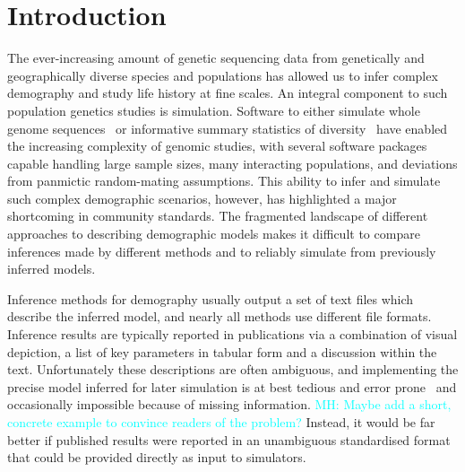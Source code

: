 \documentclass[11pt]{article}
\newcommand{\stdpopsim}[0]{\texttt{stdpopsim}}
\newcommand{\aprcomment}[1]{{\textcolor{blue}{APR: #1}}}
\newcommand{\mhcomment}[1]{{\textcolor{cyan}{MH: #1}}}
\begin{document}
\section*{Introduction}

The ever-increasing amount of genetic sequencing data from genetically and
geographically diverse species and populations has allowed us to infer complex
demography and study life history at fine scales.
An integral component to such population genetics studies is simulation.
Software to either simulate whole genome
sequences~\citep{thornton2014cpp,thornton2019-nu,staab2015scrm,baumdicker2021-iu,kelleher2016efficient,haller2019slim}
or informative summary statistics of
diversity~\citep{gutenkunst2009inferring,kamm2017efficient,jouganous2017inferring}
have enabled the increasing complexity of genomic studies, with several software
packages capable handling large sample sizes, many interacting populations, and
deviations from panmictic random-mating assumptions.
This ability to infer and simulate such complex demographic scenarios, however,
has highlighted a major shortcoming in community standards.
The fragmented landscape of different approaches to describing demographic
models makes it difficult to compare inferences made by different methods
and to reliably simulate from previously inferred models.

Inference methods for demography usually output a set of
text files which describe the inferred model,
and nearly all methods use different file formats.
Inference results are typically reported in publications
via a combination of visual depiction,
a list of key parameters in tabular form and a discussion within the text.
Unfortunately these descriptions are often ambiguous, and
implementing the precise model inferred for later simulation
is at best tedious and error prone~\citep{ragsdale2020lessons}
and occasionally impossible because of missing information. 
\mhcomment{Maybe add a short, concrete example to convince readers of the problem?}
Instead, it would be far better if published results were reported
in an unambiguous standardised format that could be provided
directly as input to simulators.
\end{document}
